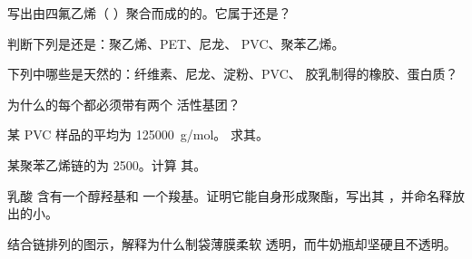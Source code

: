 \begin{exercise}[$\star$]\label{exo:g12:polymers:2}
写出由四氟乙烯（
）聚合而成的的。它属于还是？
\end{exercise}

\begin{exercise}[$\star$]\label{exo:g12:polymers:3}
判断下列是还是：聚乙烯、PET、尼龙、
PVC、聚苯乙烯。
\end{exercise}

\begin{exercise}[$\star$]\label{exo:g12:polymers:4}
下列中哪些是天然的：纤维素、尼龙、淀粉、PVC、
胶乳制得的橡胶、蛋白质？
\end{exercise}

\begin{exercise}[$\star$]\label{exo:g12:polymers:5}
为什么的每个都必须带有两个
活性基团？
\end{exercise}

\begin{exercise}[$\star\star$]\label{exo:g12:polymers:6}
某 PVC 样品的平均为 \qty{125000}{g/mol}。
求其。
\end{exercise}

\begin{exercise}[$\star\star$]\label{exo:g12:polymers:7}
某聚苯乙烯链的为 2500。计算
其。
\end{exercise}

\begin{exercise}[$\star\star$]\label{exo:g12:polymers:8}
乳酸  含有一个醇羟基和
一个羧基。证明它能自身形成聚酯，写出其
，并命名释放出的小。
\end{exercise}

\begin{exercise}[$\star\star$]\label{exo:g12:polymers:9}
结合链排列的图示，解释为什么制袋薄膜柔软
透明，而牛奶瓶却坚硬且不透明。
\end{exercise}


